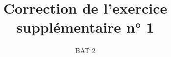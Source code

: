

\title{Correction de l'exercice supplémentaire n° 1}  
\author{BAT 2}
\date{}









\begin{frame}
 \titlepage
\end{frame}
